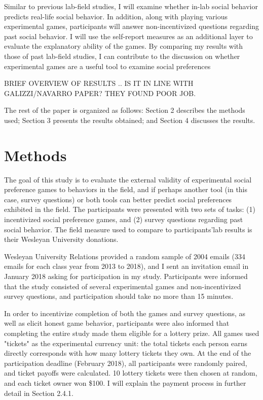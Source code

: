 \documentclass[12pt]{article}
\begin{document}
Similar to previous lab-field studies, I will examine whether in-lab social behavior predicts real-life social behavior. In addition, along with playing various experimental games, participants will answer non-incentivized questions regarding past social behavior. I will use the self-report measures as an additional layer to evaluate the explanatory ability of the games. By comparing my results with those of past lab-field studies, I can contribute to the discussion on whether experimental games are a useful tool to examine social preferences

{\color{red} BRIEF OVERVIEW OF RESULTS .. IS IT IN LINE WITH GALIZZI/NAVARRO PAPER? THEY FOUND POOR JOB. }

The rest of the paper is organized as follows: Section 2 describes the methods used; Section 3 presents the results obtained; and Section 4 discusses the results.


\section{Methods}

The goal of this study is to evaluate the external validity of experimental social preference games to behaviors in the field, and if perhaps another tool (in this case, survey questions) or both tools can better predict social preferences exhibited in the field. The participants were presented with two sets of tasks: (1) incentivized social preference games, and (2) survey questions regarding past social behavior. The field measure used to compare to participants\rq lab results is their Wesleyan University donations. 
 
Wesleyan University Relations provided a random sample of 2004 emails (334 emails for each class year from 2013 to 2018), and I sent an invitation email in January 2018 asking for participation in my study. Participants were informed that the study consisted of several experimental games and non-incentivized survey questions, and participation should take no more than 15 minutes. 

In order to incentivize completion of both the games and survey questions, as well as elicit honest game behavior, participants were also informed that completing the entire study made them eligible for a lottery prize. All games used "tickets" as the experimental currency unit: the total tickets each person earns directly corresponds with how many lottery tickets they own. At the end of the participation deadline (February 2018), all participants were randomly paired, and ticket payoffs were calculated. 10 lottery tickets were then chosen at random, and each ticket owner won \$100. I will explain the payment process in further detail in Section 2.4.1. 
\end{document}
